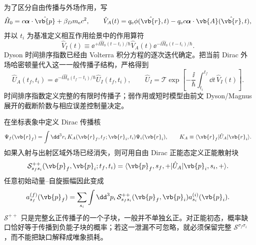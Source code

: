 为了区分自由传播与外场作用，写
\begin{equation*}
\hat H_0=c\boldsymbol\alpha\cdot\hat{\vb{p}}+\beta_Dm_{\mathrm e} c^2,
\qquad
\hat V_A(t)=q_{\mathrm e}\phi(\hat{\vb{r}},t)-q_{\mathrm e} c\boldsymbol\alpha\cdot\vb{A}(\hat{\vb{r}},t),
\end{equation*}
并以 $t_i$ 为基准定义相互作用绘景中的作用算符
\begin{equation*}
\hat V_I(t)
\equiv
\ee^{+\ii\hat H_0(t-t_i)/\hbar}
\hat V_A(t)
\ee^{-\ii\hat H_0(t-t_i)/\hbar}.
\end{equation*}
Dyson 时间排序指数已经由 Volterra 积分方程的逐次迭代确定。把当前 Dirac 外场哈密顿量代入这一一般传播子结构，严格得到
\begin{equation}
{
\hat U_A(t_f,t_i)
=\ee^{-\ii\hat H_0(t_f-t_i)/\hbar}\hat U_I(t_f,t_i),
\qquad
\hat U_I
=\mathcal T\exp\!\left[-\frac{\ii}{\hbar}
\int_{t_i}^{t_f}\dd t\,\hat V_I(t)\right].}
\label{eq:exact_external_field_interaction_picture}
\end{equation}
时间排序指数定义完整的有限时传播子；弱作用或短时模型由前文 Dyson/Magnus 展开的截断阶数与相应误差控制量决定。

在坐标表象中定义 Dirac 传播核
\begin{equation}
{
\Psi_f(\vb{r}_f)
=\int\dd^3 r_i\,
K_A(\vb{r}_f,t_f;\vb{r}_i,t_i)\Psi_i(\vb{r}_i),
\qquad
K_A\equiv\langle\vb{r}_f|\hat U_A|\vb{r}_i\rangle .}
\label{eq:exact_external_field_kernel}
\end{equation}
如果入射与出射区域外场已经消失，则可用自由 Dirac 正能态定义正能散射块
\begin{equation}
{
\mathcal S^{++}_{s_fs_i}(\vb{p}_f,\vb{p}_i;t_f,t_i)
=\langle\vb{p}_f,s_f,+|\hat U_A|\vb{p}_i,s_i,+\rangle .}
\label{eq:exact_positive_energy_external_scattering_kernel}
\end{equation}
任意初始动量--自旋振幅因此变成
\begin{equation}
{
a^{(f)}_{s_f}(\vb{p}_f)
=\sum_{s_i}\int\dd^3 p_i\,
\mathcal S^{++}_{s_fs_i}(\vb{p}_f,\vb{p}_i)
a^{(i)}_{s_i}(\vb{p}_i).}
\label{eq:exact_external_field_wavepacket_scattering}
\end{equation}
$\mathcal S^{++}$ 只是完整幺正传播子的一个子块，一般并不单独幺正。对正能初态，概率缺口恰好等于传播到负能子块的概率；若这一泄漏不可忽略，就必须保留完整 $\mathcal S^{\sigma_f\sigma_i}$，而不能把缺口解释成唯象损耗。

